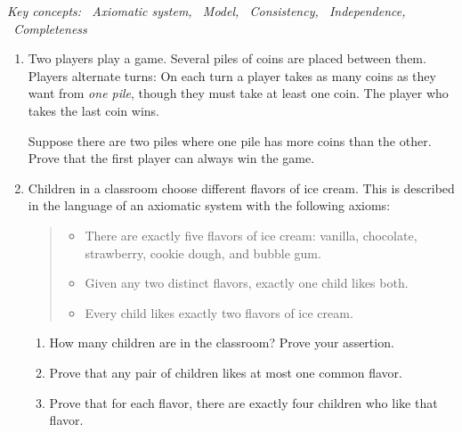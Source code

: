 \vfil


\begin{exercises}{}{}
	\emph{Key concepts: \ Axiomatic system, \ Model, \ Consistency, \ Independence, \ Completeness}
		
	\begin{enumerate}
	  \item Two players play a game. Several piles of coins are placed between them. Players alternate turns: On each turn a player takes as many coins as they want from \emph{one pile}, though they must take at least one coin. The player who takes the last coin wins.\par
	  Suppose there are two piles where one pile has more coins than the other. Prove that the first player can always win the game.
	  
	  
	  \item Children in a classroom choose different flavors of ice cream. This is described in the language of an axiomatic system with the following axioms:
	  \begin{quote}
	  \begin{itemize}
	  	\item[(A1)] There are exactly five flavors of ice cream: vanilla, chocolate, strawberry, cookie dough, and bubble gum.
	  	\item[(A2)] Given any two distinct flavors, exactly one child likes both.
	  	\item[(A3)] Every child likes exactly two flavors of ice cream.
	  \end{itemize}
	  \end{quote}
	  \begin{enumerate}
	    \item How many children are in the classroom? Prove your assertion.
	    
	    \item Prove that any pair of children likes at most one common flavor.
	    
	    \item Prove that for each flavor, there are exactly four children who like that flavor.
		\end{enumerate}
		

\end{enumerate}
\end{exercises}
